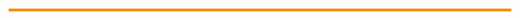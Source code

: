 \documentclass[a0,portrait]{a0poster}
\begin{document}
\begin{multicols}{3}





\end{multicols}
\vfill
\hspace{-6cm}\includegraphics[width=1.1\paperwidth]{figures/a0-faimsorange-footer.png}
\end{document}
